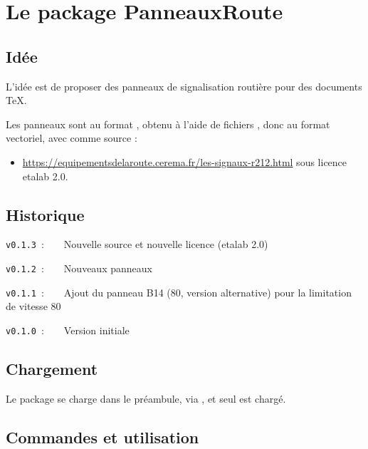 \documentclass[french,11pt,a4paper]{article}
\begin{document}
\pagebreak

\section{Le package PanneauxRoute}

\subsection{Idée}

L'idée est de proposer des panneaux de signalisation routière pour des documents \TeX.

\smallskip

Les panneaux sont au format , obtenu à l'aide de fichiers , donc au format vectoriel, avec comme source :

\medskip

\begin{itemize}
	\item \url{https://equipementsdelaroute.cerema.fr/les-signaux-r212.html} sous licence \textsf{etalab 2.0}.
\end{itemize}

\subsection{Historique}

\verb|v0.1.3|~:~~~~Nouvelle source et nouvelle licence (\textsf{etalab 2.0})

\verb|v0.1.2|~:~~~~Nouveaux panneaux

\verb|v0.1.1|~:~~~~Ajout du panneau B14 (80, version alternative) pour la limitation de vitesse 80

\verb|v0.1.0|~:~~~~Version initiale

\subsection{Chargement}

Le package se charge dans le préambule, via , et seul  est chargé.

\begin{codehigh}[language=latex/latex3,style/main=cyan!5,style/code=cyan!5]
\usepackage{PanneauxRoute}
\end{codehigh}

\subsection{Commandes et utilisation}
\end{document}
